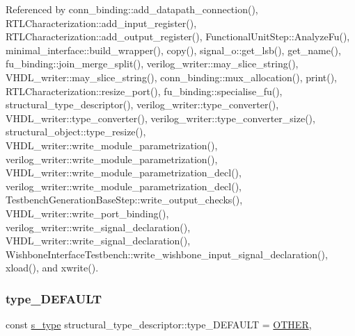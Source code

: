 Referenced by conn\+\_\+binding\+::add\+\_\+datapath\+\_\+connection(), R\+T\+L\+Characterization\+::add\+\_\+input\+\_\+register(), R\+T\+L\+Characterization\+::add\+\_\+output\+\_\+register(), Functional\+Unit\+Step\+::\+Analyze\+Fu(), minimal\+\_\+interface\+::build\+\_\+wrapper(), copy(), signal\+\_\+o\+::get\+\_\+lsb(), get\+\_\+name(), fu\+\_\+binding\+::join\+\_\+merge\+\_\+split(), verilog\+\_\+writer\+::may\+\_\+slice\+\_\+string(), V\+H\+D\+L\+\_\+writer\+::may\+\_\+slice\+\_\+string(), conn\+\_\+binding\+::mux\+\_\+allocation(), print(), R\+T\+L\+Characterization\+::resize\+\_\+port(), fu\+\_\+binding\+::specialise\+\_\+fu(), structural\+\_\+type\+\_\+descriptor(), verilog\+\_\+writer\+::type\+\_\+converter(), V\+H\+D\+L\+\_\+writer\+::type\+\_\+converter(), verilog\+\_\+writer\+::type\+\_\+converter\+\_\+size(), structural\+\_\+object\+::type\+\_\+resize(), V\+H\+D\+L\+\_\+writer\+::write\+\_\+module\+\_\+parametrization(), verilog\+\_\+writer\+::write\+\_\+module\+\_\+parametrization(), V\+H\+D\+L\+\_\+writer\+::write\+\_\+module\+\_\+parametrization\+\_\+decl(), verilog\+\_\+writer\+::write\+\_\+module\+\_\+parametrization\+\_\+decl(), Testbench\+Generation\+Base\+Step\+::write\+\_\+output\+\_\+checks(), V\+H\+D\+L\+\_\+writer\+::write\+\_\+port\+\_\+binding(), verilog\+\_\+writer\+::write\+\_\+signal\+\_\+declaration(), V\+H\+D\+L\+\_\+writer\+::write\+\_\+signal\+\_\+declaration(), Wishbone\+Interface\+Testbench\+::write\+\_\+wishbone\+\_\+input\+\_\+signal\+\_\+declaration(), xload(), and xwrite().

\mbox{\label{structstructural__type__descriptor_aa3639f196b6102423c2bc30717ede815}} 
\subsubsection{\texorpdfstring{type\+\_\+\+D\+E\+F\+A\+U\+LT}{type\_DEFAULT}}
{\footnotesize\ttfamily const \hyperlink{structstructural__type__descriptor_ae12552f84c02a972c2a084901b94cd13}{s\+\_\+type} structural\+\_\+type\+\_\+descriptor\+::type\+\_\+\+D\+E\+F\+A\+U\+LT = \hyperlink{structstructural__type__descriptor_ae12552f84c02a972c2a084901b94cd13a94b50b104b7eecf7b84aa4a7473bfb3a}{O\+T\+H\+ER}\hspace{0.3cm}{\ttfamily [static]}, {\ttfamily [private]}}



